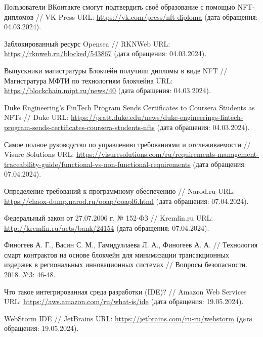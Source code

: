 \begin{thebibliography}{99\kern\bibindent}
	 Пользователи ВКонтакте смогут подтвердить своё образование с помощью NFT-дипломов // VK Press URL: \url{https://vk.com/press/nft-diploma} (дата обращения: 04.03.2024).

	 Заблокированный ресурс Opensea // RKNWeb URL: \url{https://rknweb.ru/blocked/543867} (дата обращения: 04.03.2024).

	 Выпускники магистратуры Блокчейн получили дипломы в виде NFT // Магистратура МФТИ по технологиям блокчейна URL: \url{https://blockchain.mipt.ru/news/40} (дата обращения: 04.03.2024).

	 Duke Engineering’s FinTech Program Sends Certificates to Coursera Students as NFTs // Duke URL: \url{https://pratt.duke.edu/news/duke-engineerings-fintech-program-sends-certificates-coursera-students-nfts} (дата обращения: 04.03.2024).
		
	 Самое полное руководство по управлению требованиями и отслеживаемости // Visure Solutions URL: \url{https://visuresolutions.com/ru/requirements-management-traceability-guide/functional-vs-non-functional-requirements} (дата обращения: 07.04.2024).

	 Определение требований к программному обеспечению  // Narod.ru URL: \url{https://chaox-dump.narod.ru/ooap/ooapl6.html} (дата обращения: 07.04.2024).

	 Федеральный закон от 27.07.2006 г. № 152-ФЗ // Kremlin.ru URL: \url{http://kremlin.ru/acts/bank/24154} (дата обращения: 07.04.2024).
	
	 Финогеев А. Г., Васин С. М., Гамидуллаева Л. А., Финогеев А. А. // Технология смарт контрактов на основе блокчейн для минимизации трансакционных издержек в региональных инновационных системах // Вопросы безопасности. 2018. №3: 46-48. %
	
	 Что такое интегрированная среда разработки (IDE)? // Amazon Web Services URL: \url{https://aws.amazon.com/ru/what-is/ide} (дата обращения: 19.05.2024).

	 WebStorm IDE // JetBrains URL: \url{https://jetbrains.com/ru-ru/webstorm} (дата обращения: 19.05.2024).


\end{thebibliography}
